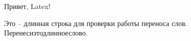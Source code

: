 \documentclass[a4paper, 12pt]{article}
\begin{document}
Привет, Latex!

Это -- длинная строка для проверки работы переноса слов. Перенесиэтодлинноеслово.
\end{document}
